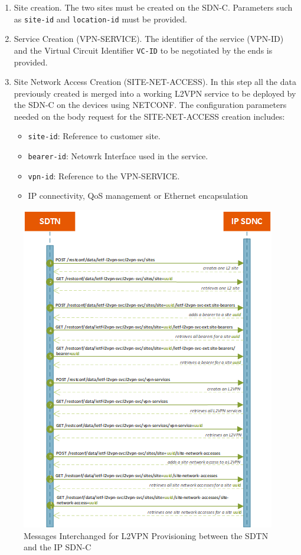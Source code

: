 \documentclass[a4paper,fleqn]{cas-dc}
\begin{document}
\begin{enumerate}
    \item Site creation. The two sites must be created on the SDN-C. Parameters such as \texttt{site-id} and \texttt{location-id}  must be provided.
    \item Service Creation (VPN-SERVICE). The identifier of the service (VPN-ID) and the Virtual Circuit Identifier \texttt{VC-ID} to be negotiated by the ends is provided.  
    \item Site Network Access Creation (SITE-NET-ACCESS). In this step all the data previously created is merged into a working L2VPN service to be deployed by the SDN-C on the devices using NETCONF. The configuration parameters needed on the body request for the SITE-NET-ACCESS creation includes: 
    \begin{itemize}
        \item \texttt{site-id}: Reference to customer site.
        \item \texttt{bearer-id}: Netowrk Interface used in the service.
        \item \texttt{vpn-id}: Reference to the VPN-SERVICE.
        \item IP connectivity, QoS management or Ethernet encapsulation
    \end{itemize}
\end{enumerate}

\begin{figure}
	\centering
		\includegraphics[width=\linewidth]{figs/l2sm_workflow_2.png}
	\caption{Messages Interchanged for L2VPN Provisioning between the SDTN and the IP SDN-C}
	\label{FIG:L2SM_workflow}
\end{figure}
\end{document}
